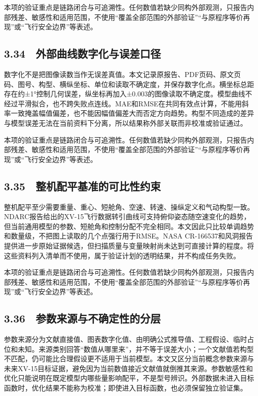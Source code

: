 \documentclass[UTF8,12pt,openany]{ctexbook}
\begin{document}
本项的验证重点是链路闭合与可追溯性。任何数值若缺少同构外部观测，只报告内部残差、敏感性和适用范围，不使用“覆盖全部范围的外部验证”“与原程序等价再现”或“飞行安全边界”等表述。

\subsection{3.34　外部曲线数字化与误差口径}

数字化不是把图像读数当作无误差真值。本文记录原报告、PDF页码、原文页码、图号、构型、横纵坐标、单位和读取不确定度，并保存数字化点。横坐标总距存在约±1°控制几何误差，纵坐标再加入±0.003的图像读取不确定度。模型曲线不经过平滑拟合，也不跨失败点连线。MAE和RMSE在共同有效点计算，不能用斜率一致掩盖幅值偏差，也不能因幅值偏差大而否定方向趋势。构型不同造成的差异与模型误差无法在当前资料下分离，所以结果称外部关联而非校准或验证通过。

本项的验证重点是链路闭合与可追溯性。任何数值若缺少同构外部观测，只报告内部残差、敏感性和适用范围，不使用“覆盖全部范围的外部验证”“与原程序等价再现”或“飞行安全边界”等表述。

\subsection{3.35　整机配平基准的可比性约束}

整机配平至少需要重量、重心、短舱角、空速、转速、操纵定义和气动构型一致。NDARC报告给出的XV-15飞行数据转引曲线可支持俯仰姿态随空速变化的趋势，但当前通用模型的参数、短舱角和控制分配不完全相同。本文因此只比较单调趋势和数量级，不把图上读取的几个点强行用于RMSE。NASA CR-166537和风洞报告提供进一步原始证据候选，但扫描质量与变量映射尚未达到可直接计算的程度。将这些资料列入清单而不使用，属于验证计划的透明结果，并不构成任务失败。

本项的验证重点是链路闭合与可追溯性。任何数值若缺少同构外部观测，只报告内部残差、敏感性和适用范围，不使用“覆盖全部范围的外部验证”“与原程序等价再现”或“飞行安全边界”等表述。

\subsection{3.36　参数来源与不确定性的分层}

参数来源分为文献直接值、图表数字化值、由明确公式推导值、工程假设、临时占位和未知。来源类别回答“数值从哪里来”，并不等于误差大小；一个文献值若构型不匹配，仍可能比合理假设更不适用于当前模型。本文又区分当前概念参数来源与未来XV-15目标证据，避免因为当前数值接近文献值就倒推其来源。参数敏感性和优化只能说明在既定模型内哪些量影响配平，不是型号辨识。外部数据未进入目标函数时，优化结果不能称为校准；即使进入目标函数，也必须保留独立验证集。
\end{document}
